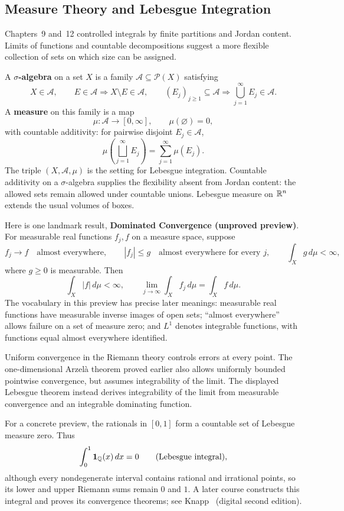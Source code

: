 \subsection*{Measure Theory and Lebesgue Integration}

Chapters~9 and~12 controlled integrals by finite partitions and Jordan
content. Limits of functions and countable decompositions suggest a more
flexible collection of sets on which size can be assigned.

A \textbf{$\sigma$-algebra} on a set $X$ is a family
$\mathcal A\subseteq\mathcal P(X)$ satisfying
\[
X\in\mathcal A,\qquad E\in\mathcal A\Longrightarrow X\setminus E\in\mathcal A,
\qquad (E_j)_{j\geq1}\subseteq\mathcal A
\Longrightarrow\bigcup_{j=1}^{\infty}E_j\in\mathcal A.
\]
A \textbf{measure} on this family is a map
\[
\mu:\mathcal A\to[0,\infty],\qquad \mu(\varnothing)=0,
\]
with countable additivity: for pairwise disjoint $E_j\in\mathcal A$,
\[
\boxed{\mu\left(\bigsqcup_{j=1}^{\infty}E_j\right)
=\sum_{j=1}^{\infty}\mu(E_j).}
\]
The triple $(X,\mathcal A,\mu)$ is the setting for Lebesgue integration.
Countable additivity on a $\sigma$-algebra supplies the flexibility absent
from Jordan content: the allowed sets remain allowed under countable unions.
Lebesgue measure on $\mathbb{R}^n$ extends the usual volumes of boxes.

Here is one landmark result, \textbf{Dominated Convergence (unproved
preview)}. For measurable real functions $f_j,f$ on a measure space, suppose
\[
f_j\to f\quad\text{almost everywhere},\qquad
|f_j|\leq g\quad\text{almost everywhere for every }j,\qquad
\int_X g\,d\mu<\infty,
\]
where $g\geq0$ is measurable. Then
\[
\boxed{\int_X|f|\,d\mu<\infty,\qquad
\lim_{j\to\infty}\int_X f_j\,d\mu=\int_X f\,d\mu.}
\]
The vocabulary in this preview has precise later meanings: measurable real
functions have measurable inverse images of open sets; ``almost everywhere''
allows failure on a set of measure zero; and $L^1$ denotes integrable
functions, with functions equal almost everywhere identified.

Uniform convergence in the Riemann theory controls errors at every point.
The one-dimensional Arzel\`a theorem proved earlier also allows uniformly
bounded pointwise convergence, but assumes integrability of the limit.
The displayed Lebesgue theorem instead derives integrability of the limit
from measurable convergence and an integrable dominating function.

For a concrete preview, the rationals in $[0,1]$ form a countable set of
Lebesgue measure zero. Thus
\[
\int_0^1\mathbf1_{\mathbb{Q}}(x)\,dx=0\qquad\text{(Lebesgue integral)},
\]
although every nondegenerate interval contains rational and irrational
points, so its lower and upper Riemann sums remain $0$ and $1$.
A later course constructs this integral and proves its convergence theorems;
see Knapp~\cite[Theorem~5.30]{knapp-basic-real} (digital second edition).

